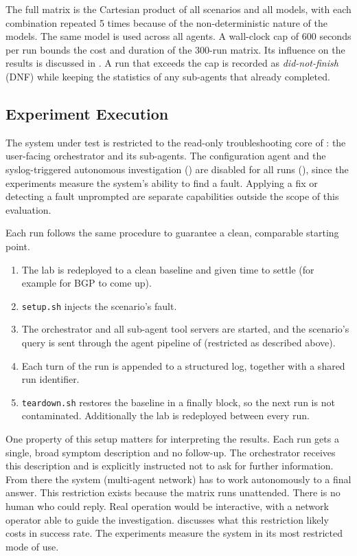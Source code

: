The full matrix is the Cartesian product of all scenarios and all models, with each combination
repeated 5 times because of the non-deterministic nature of the models. The same model is used
across all agents. A wall-clock cap
of 600 seconds per run bounds the cost and duration of the 300-run matrix. Its influence on
the results is discussed in . A run that exceeds
the cap is recorded as \emph{did-not-finish} (DNF) while keeping the statistics of any sub-agents that
already completed.

\subsection{Experiment Execution}
\label{sec:experiment-execution}
The system under test is restricted to the read-only troubleshooting core of
: the user-facing orchestrator and its sub-agents. The configuration
agent and the syslog-triggered autonomous investigation () are
disabled for all runs (), since the experiments measure
the system's ability to find a fault. Applying a fix or detecting a fault unprompted are
separate capabilities outside the scope of this evaluation.

Each run follows the same procedure to guarantee a clean, comparable starting point.

\begin{enumerate}
    \item The lab is redeployed to a clean baseline and given time to settle (for example for BGP to come up).
    \item \texttt{setup.sh} injects the scenario's fault. 
    \item The orchestrator and all sub-agent tool servers are started, and the scenario's query is sent
          through the agent pipeline of  (restricted as described above).
    \item Each turn of the run is appended to a structured log, together with a shared run identifier.
    \item \texttt{teardown.sh} restores the baseline in a finally block, so the next run is not
          contaminated. Additionally the lab is redeployed between every run.
\end{enumerate}

One property of this setup matters for interpreting the results. Each run gets a single, broad symptom
description and no follow-up. The
orchestrator receives this description and is explicitly instructed not to ask for
further information. From there the system (multi-agent network) has to work autonomously to a final answer. This
restriction exists because the matrix runs unattended. There is no human who could reply.
Real operation would be interactive, with a network operator able to guide the investigation.
 discusses what this restriction likely costs in success rate. The experiments
measure the system in its most restricted mode of use.

